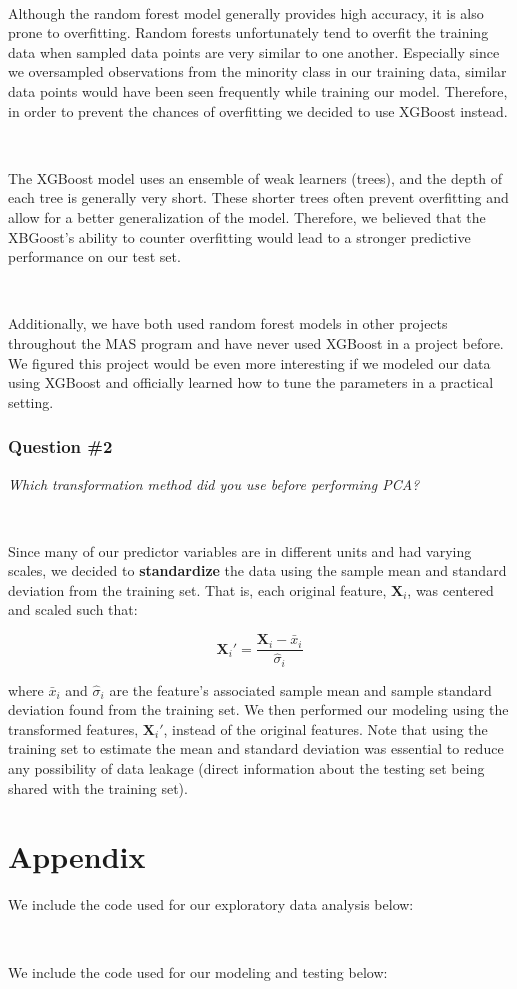 \documentclass[10pt]{article}
\begin{document}
\

Although the random forest model generally provides high accuracy, it is also prone to overfitting. Random forests unfortunately tend to overfit the training data when sampled data points are very similar to one another. Especially since we oversampled observations from the minority class in our training data, similar data points would have been seen frequently while training our model. Therefore, in order to prevent the chances of overfitting we decided to use XGBoost instead.

\

The XGBoost model uses an ensemble of weak learners (trees), and the depth of each tree is generally very short. These shorter trees often prevent overfitting and allow for a better generalization of the model. Therefore, we believed that the XBGoost's ability to counter overfitting would lead to a stronger predictive performance on our test set.

\

Additionally, we have both used random forest models in other projects throughout the MAS program and have never used XGBoost in a project before. We figured this project would be even more interesting if we modeled our data using XGBoost and officially learned how to tune the parameters in a practical setting.

\subsubsection*{Question \#2}

\textit{Which transformation method did you use before performing PCA?}

\

Since many of our predictor variables are in different units and had varying scales, we decided to \textbf{standardize} the data using the sample mean and standard deviation from the training set. That is, each original feature, $\mathbf{X}_i$, was centered and scaled such that:

$$\mathbf{X}_i' = \frac{\mathbf{X}_i-\bar{x}_i}{\hat{\sigma}_i}$$

where $\bar{x}_i$ and $\hat{\sigma}_i$ are the feature's associated sample mean and sample standard deviation found from the training set. We then performed our modeling using the transformed features, $\mathbf{X}_i'$, instead of the original features. Note that using the training set to estimate the mean and standard deviation was essential to reduce any possibility of data leakage (direct information about the testing set being shared with the training set). 

\newpage 

\printbibliography

\newpage

\section*{Appendix}

We include the code used for our exploratory data analysis below:

\



\newpage

We include the code used for our modeling and testing below:

\


\end{document}
